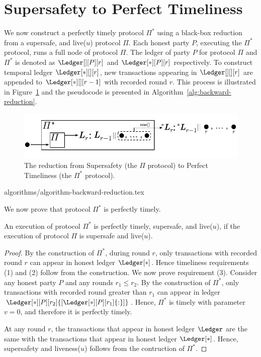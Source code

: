 \section{Supersafety to Perfect Timeliness}

We now construct a perfectly timely protocol $\Pi^*$
using a black-box reduction from a supersafe, and live($u$) protocol $\Pi$.
Each honest party $P$, executing the $\Pi^*$ protocol, runs a
full node of protocol $\Pi$.
The ledger of party $P$ for protocol $\Pi$ and $\Pi^*$ is denoted as $\Ledger[][P][r]$ and
$\Ledger[*][P][r]$ respectively.
To construct temporal ledger $\Ledger[*][][r]$,
new transactions appearing in
$\Ledger[][][r]$ are appended to $\Ledger[*][][r - 1]$ with recorded round $r$.
This process is illustrated
in Figure~\ref{fig:backward-reduction}
and the pseudocode is presented in Algorithm~\ref{alg:backward-reduction}.

\begin{figure}
  \centering
  \includegraphics[width=0.9\columnwidth,keepaspectratio]{figures/backward-reduction.pdf}
  \caption{The reduction from Supersafety
    (the $\Pi$ protocol) to Perfect Timeliness (the $\Pi^*$ protocol).
  }
 \label{fig:backward-reduction}
\end{figure}

{algorithms/algorithm-backward-reduction.tex}

We now prove that protocol $\Pi^*$ is perfectly timely.

\begin{theorem}
  An execution of protocol $\Pi^*$ is perfectly timely, supersafe, and live($u$), if the execution of
  protocol $\Pi$ is supersafe and live($u$).
\end{theorem}
\begin{proof}
  By the construction of $\Pi^*$, during round $r$, only transactions with
  recorded round $r$ can appear in honest ledger $\Ledger[*]$.
  Hence timeliness requirements (1) and (2) follow from the construction.
  We now prove requirement (3).
  Consider any honest party $P$ and any rounds $r_1 \leq r_2$.
  By the construction of $\Pi^*$, only transactions with recorded round greater
  than $r_1$ can appear in ledger $\Ledger[*][P][r_2]{[\Ledger[*][P][r_1]{:}]}$.
  Hence, $\Pi^*$ is timely with parameter $v = 0$, and therefore it is perfectly timely.

  At any round $r$, the transactions that appear in honest ledger $\Ledger$
  are the same with the transactions that appear in honest ledger $\Ledger[*]$.
  Hence, supersafety and liveness($u$) follows from the contruction of $\Pi^*$.
  \Qed
\end{proof}


